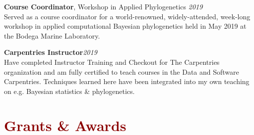 \documentclass[11pt,margin,line]{resume}
\begin{document}
\begin{resume}
\textbf{Course Coordinator}, Workshop in Applied Phylogenetics \hfill \emph{2019}\\
Served as a course coordinator for a world-renowned, widely-attended, week-long workshop in applied computational Bayesian phylogenetics held in May 2019 at the Bodega Marine Laboratory.
\vspace{-1.5mm}

\textbf{Carpentries Instructor}\hfill \emph{2019}\\
Have completed Instructor Training and Checkout for The Carpentries organization and am fully certified to teach courses in the Data and Software Carpentries. Techniques learned here have been integrated into my own teaching on e.g. Bayesian statistics \& phylogenetics.
\vspace{-4.5mm}

\begin{comment}
\section{\large\textcolor{DarkRed}{Field \& Labwork}}

\textbf{Archaeological / Paleontological Excavator} \hfill \emph{2013}\\
During the 2013 summer field season I helped in excavation efforts ongoing at La Ferrassie, a Neandertal archaeological and paleontological site in Savignac-de-Miremont, France.
\vspace{-1.5mm}

\textbf{Water Quality Analyst} \hfill \emph{2011}\\
I performed water quality analyses (of salinity, reactive nitrogen concentrations, etc.) of a large set of streams distributed across the North Island of New Zealand.
\vspace{-1.5mm}

\textbf{Stable Isotope Ecologist} \hfill \emph{2012 - 2013}\\
As an undergraduate researcher, I examined how environmental and ecological conditions were recorded in enamel stable isotope ratios (carbon and oxygen) and dental microwear textures for several marsupial taxa throughout Australasia.
\vspace{-1.5mm}
\end{comment}

\section{\large\textcolor{DarkRed}{Grants \& Awards}}


\end{resume}
\end{document}
